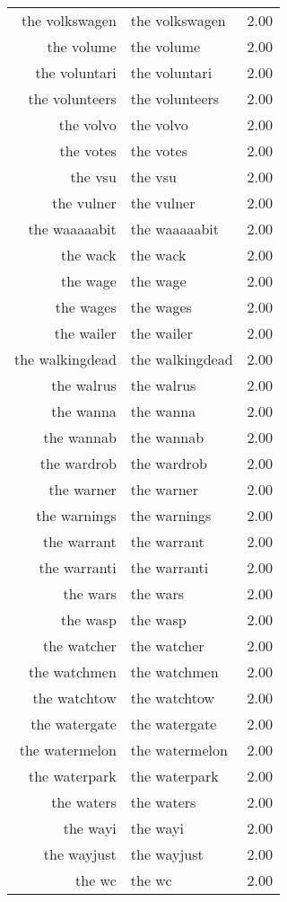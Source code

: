 \begin{table}[ht]
\begin{tabular}{rlr}
  the volkswagen & the volkswagen & 2.00 \\ 
  the volume & the volume & 2.00 \\ 
  the voluntari & the voluntari & 2.00 \\ 
  the volunteers & the volunteers & 2.00 \\ 
  the volvo & the volvo & 2.00 \\ 
  the votes & the votes & 2.00 \\ 
  the vsu & the vsu & 2.00 \\ 
  the vulner & the vulner & 2.00 \\ 
  the waaaaabit & the waaaaabit & 2.00 \\ 
  the wack & the wack & 2.00 \\ 
  the wage & the wage & 2.00 \\ 
  the wages & the wages & 2.00 \\ 
  the wailer & the wailer & 2.00 \\ 
  the walkingdead & the walkingdead & 2.00 \\ 
  the walrus & the walrus & 2.00 \\ 
  the wanna & the wanna & 2.00 \\ 
  the wannab & the wannab & 2.00 \\ 
  the wardrob & the wardrob & 2.00 \\ 
  the warner & the warner & 2.00 \\ 
  the warnings & the warnings & 2.00 \\ 
  the warrant & the warrant & 2.00 \\ 
  the warranti & the warranti & 2.00 \\ 
  the wars & the wars & 2.00 \\ 
  the wasp & the wasp & 2.00 \\ 
  the watcher & the watcher & 2.00 \\ 
  the watchmen & the watchmen & 2.00 \\ 
  the watchtow & the watchtow & 2.00 \\ 
  the watergate & the watergate & 2.00 \\ 
  the watermelon & the watermelon & 2.00 \\ 
  the waterpark & the waterpark & 2.00 \\ 
  the waters & the waters & 2.00 \\ 
  the wayi & the wayi & 2.00 \\ 
  the wayjust & the wayjust & 2.00 \\ 
  the wc & the wc & 2.00 \\ 

\end{tabular}
\end{table}
